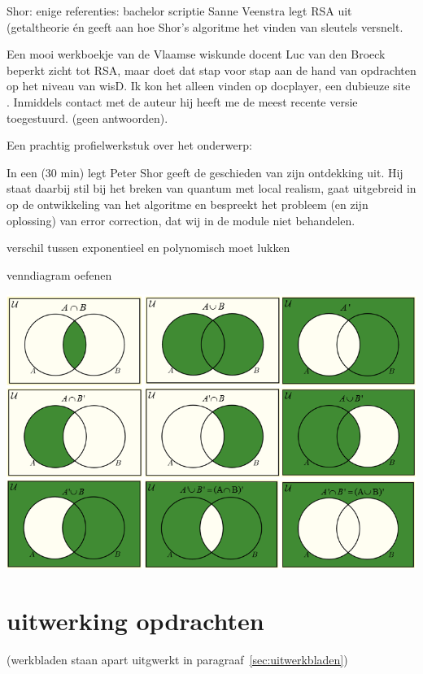 \documentclass[../../main.tex]{subfiles}
\begin{document}
Shor: enige referenties: bachelor scriptie Sanne Veenstra \cite{Veenstra2018} legt RSA uit (getaltheorie \'en geeft aan hoe Shor's algoritme het vinden van sleutels versnelt. 

Een mooi werkboekje van de Vlaamse wiskunde docent Luc van den Broeck beperkt zicht tot RSA, maar doet dat stap voor stap aan de hand van opdrachten op het niveau van wisD. Ik kon het alleen vinden op docplayer, een dubieuze site \cite{Broeck2017}. Inmiddels contact met de auteur hij heeft me de meest recente versie toegestuurd. (geen antwoorden).

Een prachtig profielwerkstuk over het onderwerp: \cite{Tess2020}


In een  (30 min) legt Peter Shor geeft de geschieden van zijn ontdekking uit. Hij staat daarbij stil bij het breken van quantum met local realism, gaat uitgebreid in op de ontwikkeling van het algoritme en bespreekt het probleem (en zijn oplossing) van error correction, dat wij in de module niet behandelen.

verschil tussen exponentieel en polynomisch moet lukken


venndiagram oefenen

\includegraphics[width=\textwidth]{./img/venn-diagrams.png
}
\fi%

\section{uitwerking opdrachten}
(werkbladen staan apart uitgwerkt in paragraaf~\ref{sec:uitwerkbladen})
\end{document}
